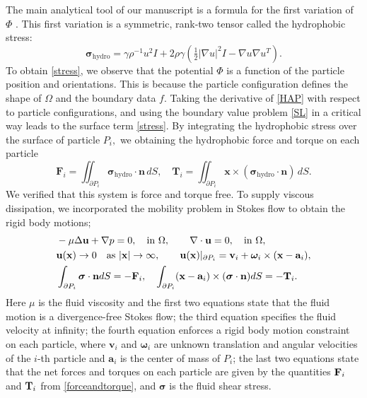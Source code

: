 The main analytical tool of our manuscript 
is a formula for the first variation of $\Phi$ \cite{Bandle2015,Schiffer1954,Grinfeld2010}. 
This first variation  is a symmetric, rank-two tensor called the hydrophobic stress:
\begin{equation}
  \label{stress}
\boldsymbol{\sigma}_{\text{hydro}} = \gamma \rho^{-1} u^2 I + 2\rho \gamma (\tfrac{1}{2}|\nabla u|^2I - \nabla u \nabla u^T).
\end{equation}
To obtain \eqref{stress}, we observe that the potential $\Phi$ is a function of the particle position and orientations.
This is because the particle configuration defines the shape of $\Omega$ and the boundary data $f.$ 
Taking the derivative of \eqref{HAP} with respect to particle configurations, and using the boundary value problem \eqref{SL}
in a critical way leads to the surface term \eqref{stress}.  
By integrating the hydrophobic stress over the surface of particle $P_i,$ we obtaining the hydrophobic force and torque on each particle 
\begin{equation}
  \label{forceandtorque}
  \mathbf{F}_i = \iint_{\partial P_i} \boldsymbol{\sigma}_{\text{hydro}} \cdot \mathbf{n} \,dS,\quad
  \mathbf{T}_i = \iint_{\partial P_i} \mathbf{x} \times (\boldsymbol{\sigma}_{\text{hydro}} \cdot \mathbf{n}) \,dS.
\end{equation}
We verified that this system is force and torque free.
To supply viscous dissipation, 
we incorporated the mobility problem in Stokes flow to obtain the rigid body motions; 
\begin{equation}
\label{eq:stokes}
\begin{aligned}
&-\mu \Delta {\bf u} + \nabla p = 0, \quad \text{in}\ \Omega, \qquad 
\nabla \cdot {\bf u} = 0,  \quad \text{in}\ \Omega,\\
&{\bf u}({\bf x}) \to 0 \quad \text{as}\ |{\bf x}|\to \infty,\qquad 
  \mathbf{u}(\mathbf{x})|_{\partial P_i} = \mathbf{v}_i +
\boldsymbol{\omega}_i\times(\mathbf{x} - \mathbf{a}_i),\\
&\int_{\partial P_i}\boldsymbol{\sigma}\cdot {\bf n} dS=-{\bf F}_i, \quad
\int_{\partial P_i}(\mathbf{x}-\mathbf{a}_i)\times (\boldsymbol{\sigma} \cdot \mathbf{n}) dS=-{\bf T}_i.
\end{aligned}
\end{equation}
Here $\mu$ is the fluid viscosity and the first two equations state
that the fluid motion is a
divergence-free Stokes flow; the third equation specifies the fluid
velocity at infinity;
the fourth equation enforces a rigid body motion constraint on each
particle, where
$\mathbf{v}_i$ and $\boldsymbol{\omega}_i$ are unknown translation and
angular velocities
of the $i$-th particle and $\mathbf{a}_i$ is the center of mass of $P_i$;
the last two equations state that the net forces and torques
on each particle are given by the quantities ${\bf F}_i$ and ${\bf T}_i$
from \eqref{forceandtorque}, and $\boldsymbol{\sigma}$ is the fluid shear stress. 

